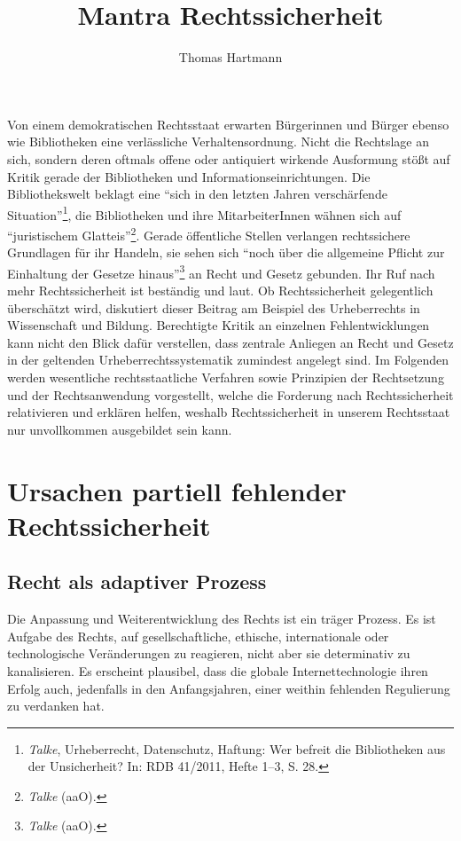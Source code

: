 \documentclass[output=paper]{langscibook}
\title{Mantra Rechtssicherheit}
\author{Thomas Hartmann}
\begin{document}
\maketitle

Von einem demokratischen Rechtsstaat erwarten Bürgerinnen und Bürger
ebenso wie Bibliotheken eine verlässliche Verhaltensordnung. Nicht die
Rechtslage an sich, sondern deren oftmals offene oder antiquiert
wirkende Ausformung stößt auf Kritik gerade der Bibliotheken und
Informationseinrichtungen. Die Bibliothekswelt beklagt eine
\enquote{sich in den letzten Jahren verschärfende Situation}\footnote{\emph{Talke},
  Urheberrecht, Datenschutz, Haftung: Wer befreit die Bibliotheken aus
  der Unsicherheit? In: RDB 41/2011, Hefte 1--3, S. 28.}, die
Bibliotheken und ihre MitarbeiterInnen wähnen sich auf
\enquote{juristischem Glatteis}\footnote{\emph{Talke} (aaO).}. Gerade
öffentliche Stellen verlangen rechtssichere Grundlagen für ihr Handeln,
sie sehen sich \enquote{noch über die allgemeine Pflicht zur Einhaltung
der Gesetze hinaus}\footnote{\emph{Talke} (aaO).} an Recht und Gesetz
gebunden. Ihr Ruf nach mehr Rechtssicherheit ist beständig und laut. Ob
Rechtssicherheit gelegentlich überschätzt wird, diskutiert dieser
Beitrag am Beispiel des Urheberrechts in Wissenschaft und Bildung.
Berechtigte Kritik an einzelnen Fehlentwicklungen kann nicht den Blick
dafür verstellen, dass zentrale Anliegen an Recht und Gesetz in der
geltenden Urheberrechtssystematik zumindest angelegt sind. Im Folgenden
werden wesentliche rechtsstaatliche Verfahren sowie Prinzipien der
Rechtsetzung und der Rechtsanwendung vorgestellt, welche die Forderung
nach Rechtssicherheit relativieren und erklären helfen, weshalb
Rechtssicherheit in unserem Rechtsstaat nur unvollkommen ausgebildet
sein kann.

\hypertarget{ursachen-partiell-fehlender-rechtssicherheit}{%
\section{Ursachen partiell fehlender
Rechtssicherheit}\label{ursachen-partiell-fehlender-rechtssicherheit}}

\hypertarget{recht-als-adaptiver-prozess}{%
\subsection{Recht als adaptiver
Prozess}\label{recht-als-adaptiver-prozess}}

Die Anpassung und Weiterentwicklung des Rechts ist ein träger Prozess.
Es ist Aufgabe des Rechts, auf gesellschaftliche, ethische,
internationale oder technologische Veränderungen zu reagieren, nicht
aber sie determinativ zu kanalisieren. Es erscheint plausibel, dass die
globale Internettechnologie ihren Erfolg auch, jedenfalls in den
Anfangsjahren, einer weithin fehlenden Regulierung zu verdanken hat.
\end{document}
